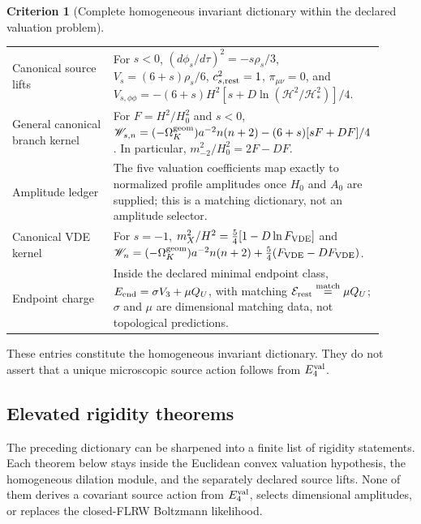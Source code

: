\documentclass[11pt,a4paper]{article}
\def\dd{d}%
\def\Dil{D}%
\def\QU{Q_U}%
\numberwithin{equation}{section}
\theoremstyle{definition}
\newtheorem{criterion}{Criterion}
\theoremstyle{plain}
\theoremstyle{remark}
\newcommand{\Dil}{\mathscr{D}}
\newcommand{\Efour}{E_4}
\newcommand{\dd}{\mathrm{d}}
\newcommand{\QU}{Q_U}
\begin{document}
\begin{criterion}[Complete homogeneous invariant dictionary within the declared valuation problem]
\begin{center}
\begin{tabular}{p{0.27\linewidth}p{0.64\linewidth}}
Canonical source lifts &
For \(s<0\),
\((\dd\phi_s/\dd\tau)^2=-s\rho_s/3\),
\(V_s=(6+s)\rho_s/6\),
\(c_{s,\rm rest}^2=1\), \(\pi_{\mu\nu}=0\), and
\(V_{s,\phi\phi}=-(6+s)H^2[s+\Dil\ln(\mathcal H^2/\mathcal H_*^2)]/4\). \\
General canonical branch kernel &
For \(F=H^2/H_0^2\) and \(s<0\),
\(\mathscr W_{s,n}=(-\Omega_K^{\rm geom})a^{-2}n(n+2)
-(6+s)[sF+\Dil F]/4\).  In particular,
\(m_{-2}^2/H_0^2=2F-\Dil F\). \\
Amplitude ledger &
The five valuation coefficients map exactly to normalized profile amplitudes
once \(H_0\) and \(A_0\) are supplied; this is a matching dictionary, not an
amplitude selector. \\
Canonical VDE kernel &
For \(s=-1\),
\(m_X^2/H^2=\frac54[1-\Dil\ln F_{\rm VDE}]\) and
\(\mathscr W_n=(-\Omega_K^{\rm geom})a^{-2}n(n+2)+\frac54(F_{\rm VDE}-\Dil F_{\rm VDE})\). \\
Endpoint charge &
Inside the declared minimal endpoint class,
\(E_{\rm end}=\sigma V_3+\mu\QU\), with matching
\(\mathcal E_{\rm rest}\overset{\rm match}{=}\mu\QU\); \(\sigma\) and \(\mu\) are dimensional matching data, not topological predictions. \\
\bottomrule
\end{tabular}
\end{center}
These entries constitute the homogeneous invariant dictionary.  They do not
assert that a unique microscopic source action follows from
\(\Efour^{\rm val}\).
\end{criterion}

\subsection{Elevated rigidity theorems}
\label{sec:elevated-rigidity-theorems}

The preceding dictionary can be sharpened into a finite list of rigidity
statements.  Each theorem below stays inside the Euclidean convex valuation
hypothesis, the homogeneous dilation module, and the separately declared source
lifts.  None of them derives a covariant source action from \(\Efour^{\rm val}\),
selects dimensional amplitudes, or replaces the closed-FLRW Boltzmann
likelihood.
\end{document}
